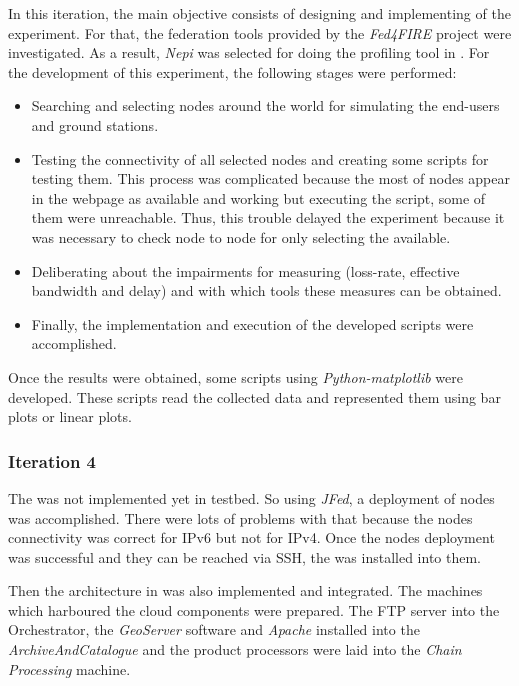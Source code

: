 In this iteration, the main objective consists of designing and implementing of the
\pl experiment. For that, the federation tools provided by the \emph{Fed4FIRE}
project were investigated. As a result, \emph{Nepi} was selected for doing the
profiling tool in \pl. 
For the development of this experiment, the following stages were performed:
\begin{itemize}
\item Searching and selecting nodes around the world for simulating the
  end-users and ground stations.
\item Testing the connectivity of all selected nodes and creating some scripts
  for testing them. This process was complicated because the most of nodes
  appear in the \pl webpage as available and working but executing the script,
  some of them were unreachable. Thus, this trouble delayed the experiment
  because it was necessary to check node to node for only selecting the available.
\item Deliberating about the impairments for measuring (loss-rate, effective
  bandwidth and delay) and with which tools these measures can be obtained. 
\item Finally, the implementation and execution of the developed scripts were accomplished.
\end{itemize}

Once the results were obtained, some scripts using \emph{Python-matplotlib} were
developed. These scripts read the collected data and represented them using bar
plots or linear plots. 

\subsubsection{Iteration 4}

The \sss was not implemented yet in \vw testbed. So using \emph{JFed}, a
deployment of \vw nodes was accomplished. There were lots of problems with that
because the nodes connectivity was correct for \ac{IP}v6 but not for
\ac{IP}v4. Once the nodes deployment was successful and they can be reached via
\ac{SSH}, the \sss was installed into them.  

Then the architecture in \bonfire was also implemented and integrated. The
machines which harboured the cloud components were prepared. The \ac{FTP} server
into the Orchestrator, the \emph{GeoServer} software and \emph{Apache} installed
into the \emph{ArchiveAndCatalogue} and the product processors were laid into
the \emph{Chain Processing} machine.

